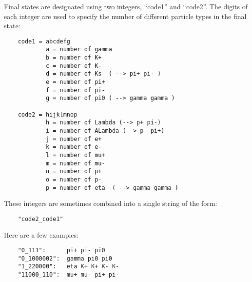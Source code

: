 \documentclass[11pt]{article}
\begin{document}
Final states are designated using two integers, ``code1'' and ``code2''.  The digits of each integer are used to specify the number of different particle types in the final state:
\begin{verbatim}
    code1 = abcdefg
            a = number of gamma
            b = number of K+
            c = number of K-
            d = number of Ks  ( --> pi+ pi- )
            e = number of pi+
            f = number of pi-
            g = number of pi0 ( --> gamma gamma )

    code2 = hijklmnop
            h = number of Lambda (--> p+ pi-)
            i = number of ALambda (--> p- pi+)
            j = number of e+
            k = number of e-
            l = number of mu+
            m = number of mu-
            n = number of p+
            o = number of p-
            p = number of eta  ( --> gamma gamma )
\end{verbatim}
These integers are sometimes combined into a single string of the form:
\begin{verbatim}
    "code2_code1"
\end{verbatim}
Here are a few examples:
\begin{verbatim}
    "0_111":      pi+ pi- pi0
    "0_1000002":  gamma pi0 pi0
    "1_220000":   eta K+ K+ K- K-
    "11000_110":  mu+ mu- pi+ pi-
\end{verbatim}
\end{document}
